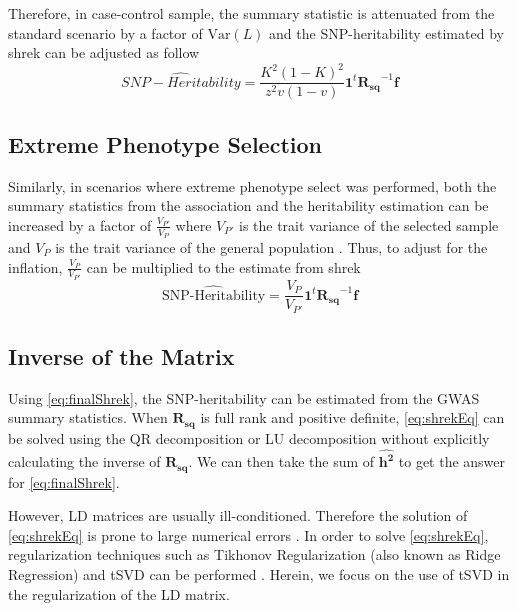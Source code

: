 \documentclass[12pt]{scrbook}
\begin{document}
Therefore, in case-control sample, the summary statistic is attenuated from the standard scenario by a factor of $\mathrm{Var}(L)$ and the \gls{SNP}-heritability estimated by \gls{shrek} can be adjusted as follow
\begin{equation}
\hat{SNP-Heritability} =\frac{K^2(1-K)^2}{z^2v(1-v)} \boldsymbol{1}^t\boldsymbol{R_{sq}}^{-1}\boldsymbol{f}
\label{eq:caseControlHerit}
\end{equation}

\subsection{Extreme Phenotype Selection}
Similarly, in scenarios where extreme phenotype select was performed, both the summary statistics from the association and the heritability estimation can be increased by a factor of $\frac{V_{P'}}{V_P}$ where $V_{P'}$ is the trait variance of the selected sample and $V_P$ is the trait variance of the general population \citep{Sham2014}.
Thus, to adjust for the inflation, $\frac{V_P}{V_{P'}}$ can be multiplied to the estimate from \gls{shrek}
\begin{equation}
\hat{\text{SNP-Heritability}} = \frac{V_P}{V_{P'}}\boldsymbol{1}^t\boldsymbol{R_{sq}}^{-1}\boldsymbol{f}
\label{eq:extremeShrek}
\end{equation}

\subsection{Inverse of the  Matrix}
Using \cref{eq:finalShrek}, the \gls{SNP}-heritability can be estimated from the \gls{GWAS} summary statistics.
When $\boldsymbol{R_{sq}}$ is full rank and positive definite, \cref{eq:shrekEq} can be solved using the QR decomposition or LU decomposition without explicitly calculating the inverse of $\boldsymbol{R_{sq}}$.
We can then take the sum of $\boldsymbol{\hat{h^2}}$ to get the answer for \cref{eq:finalShrek}.

However, \gls{LD} matrices are usually ill-conditioned.
Therefore the solution of \cref{eq:shrekEq} is prone to large numerical errors \citep{Neumaier1998}.
In order to solve \cref{eq:shrekEq}, regularization techniques such as Tikhonov Regularization (also known as Ridge Regression) and \gls{tSVD} can be performed \citep{Neumaier1998}. 
Herein, we focus on the use of \gls{tSVD} in the regularization of the \gls{LD} matrix.
\end{document}

